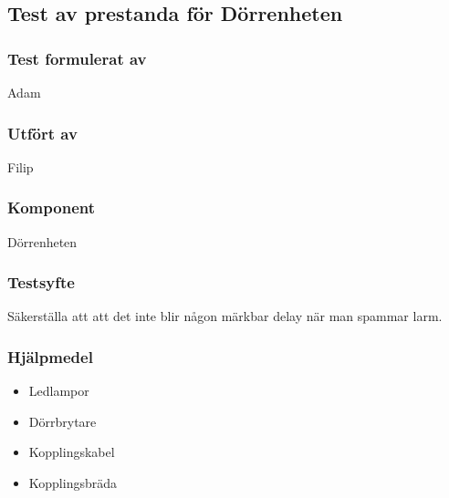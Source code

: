 \clearpage
\subsection{Test av prestanda för Dörrenheten}
\label{test:prestandaTest}

\setlength{\columnsep}{1cm}




\begin{multicols}{2}
\subsubsection*{Test formulerat av}
Adam

\subsubsection*{Utfört av}
Filip


\end{multicols}
\subsubsection*{Komponent}
Dörrenheten


\subsubsection*{Testsyfte}
Säkerställa att att det inte blir någon märkbar delay när man spammar larm.


\subsubsection*{Hjälpmedel}
\begin{itemize}
	\item Ledlampor
	\item Dörrbrytare
	\item Kopplingskabel
	\item Kopplingsbräda
\end{itemize}



